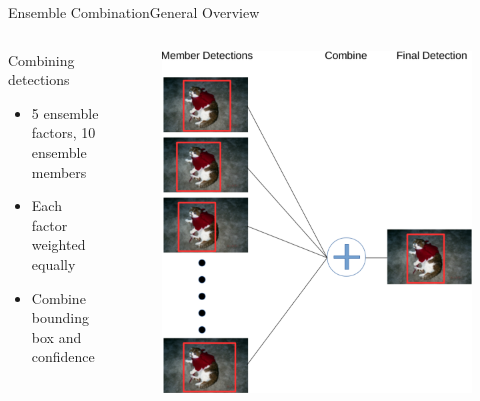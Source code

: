 \begin{frame}{Ensemble Combination}{General Overview}
\begin{columns}
        \begin{block}{Combining detections}
        \begin{itemize}
            \item 5 ensemble factors, 10 ensemble members
            \item Each factor weighted equally
            \item Combine bounding box and confidence
        \end{itemize}
    \end{block}
        \begin{figure}
            \includegraphics[width=1.0 \textwidth]{figs/ensemble.pdf}
        \end{figure}
    \end{columns}
\end{frame}

